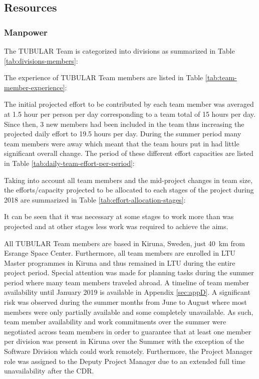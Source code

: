 \subsection{Resources}

\subsubsection{Manpower}
The TUBULAR Team is categorized into divisions as summarized in Table \ref{tab:divisions-members}:



The experience of TUBULAR Team members are listed in Table \ref{tab:team-member-experience}:



The initial projected effort to be contributed by each team member was averaged at 1.5 hour per person per day corresponding to a team total of 15 hours per day. Since then, 3 new members had been included in the team thus increasing the projected daily effort to 19.5 hours per day. During the summer period many team members were away which meant that the team hours put in had little significant overall change. The period of these different effort capacities are listed in Table \ref{tab:daily-team-effort-per-period}:



Taking into account all team members and the mid-project changes in team size, the efforts/capacity projected to be allocated to each stages of the project during 2018 are summarized in Table \ref{tab:effort-allocation-stages}:



It can be seen that it was necessary at some stages to work more than was projected and at other stages less work was required to achieve the aims.

All TUBULAR Team members are based in Kiruna, Sweden, just \SI{40}{\kilo\meter} from Esrange Space Center. Furthermore, all team members are enrolled in LTU Master programmes in Kiruna and thus remained in LTU during the entire project period. Special attention was made for planning tasks during the summer period where many team members traveled abroad. A timeline of team member availability  until January 2019 is available in Appendix \ref{sec:appD}. A significant risk was observed during the summer months from June to August where most members were only partially available and some completely unavailable. As such, team member availability and work commitments over the summer were negotiated across team members in order to guarantee that at least one member per division was present in Kiruna over the Summer with the exception of the Software Division which could work remotely. Furthermore, the Project Manager role was assigned to the Deputy Project Manager due to an extended full time unavailability after the CDR.

